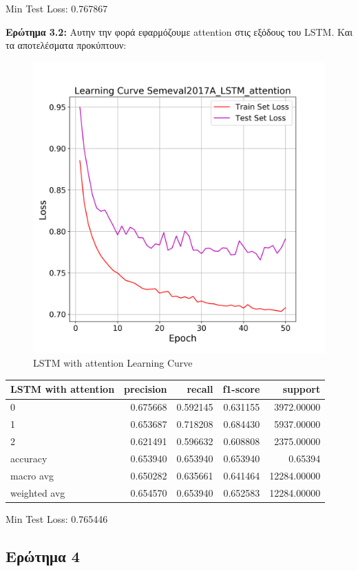 \documentclass[12pt]{article}
\begin{document}
Min Test Loss: 0.767867



\textbf{Ερώτημα 3.2:}
Αυτην την φορά εφαρμόζουμε attention στις εξόδους του LSTM. Και τα αποτελέσματα προκύπτουν:

\begin{figure}[h!]
	\centering
	\includegraphics[width=0.6\linewidth]{./img/Semeval2017A/lSTM_attention_loss}
	\caption{LSTM with attention Learning Curve}
	\label{fig:sin}
\end{figure}


\begin{tabular}{lrrrr}
\toprule
LSTM with attention &  precision &    recall &  f1-score &      support \\
\midrule
0            &   0.675668 &  0.592145 &  0.631155 &   3972.00000 \\
1            &   0.653687 &  0.718208 &  0.684430 &   5937.00000 \\
2            &   0.621491 &  0.596632 &  0.608808 &   2375.00000 \\
accuracy     &   0.653940 &  0.653940 &  0.653940 &      0.65394 \\
macro avg    &   0.650282 &  0.635661 &  0.641464 &  12284.00000 \\
weighted avg &   0.654570 &  0.653940 &  0.652583 &  12284.00000 \\
\bottomrule
\end{tabular}

Min Test Loss: 0.765446




\subsection{Ερώτημα 4}
\end{document}
